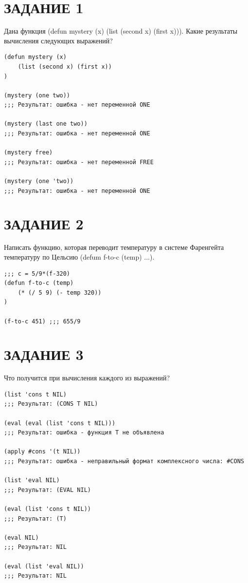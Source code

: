 \section{ЗАДАНИЕ 1}

Дана функция (defun mystery (x) (list (second x) (first x))).
Какие результаты вычисления следующих выражений?

\begin{lstlisting}
(defun mystery (x)
    (list (second x) (first x))
)

(mystery (one two))
;;; Результат: ошибка - нет переменной ONE

(mystery (last one two))
;;; Результат: ошибка - нет переменной ONE

(mystery free)
;;; Результат: ошибка - нет переменной FREE

(mystery (one 'two))
;;; Результат: ошибка - нет переменной ONE
\end{lstlisting}

\section{ЗАДАНИЕ 2}

Написать функцию, которая переводит температуру в системе Фаренгейта
температуру по Цельсию (defum f-to-c (temp) ...).

\begin{lstlisting}
;;; c = 5/9*(f-320)
(defun f-to-c (temp)
    (* (/ 5 9) (- temp 320))
)

(f-to-c 451) ;;; 655/9
\end{lstlisting}

\section{ЗАДАНИЕ 3}

Что получится при вычисления каждого из выражений?

\begin{lstlisting}
(list 'cons t NIL)
;;; Результат: (CONS T NIL)

(eval (eval (list 'cons t NIL)))
;;; Результат: ошибка - функция T не объявлена

(apply #cons '(t NIL))
;;; Результат: ошибка - неправильный формат комплексного числа: #CONS

(list 'eval NIL)
;;; Результат: (EVAL NIL)

(eval (list 'cons t NIL))
;;; Результат: (T)

(eval NIL)
;;; Результат: NIL

(eval (list 'eval NIL))
;;; Результат: NIL
\end{lstlisting}

